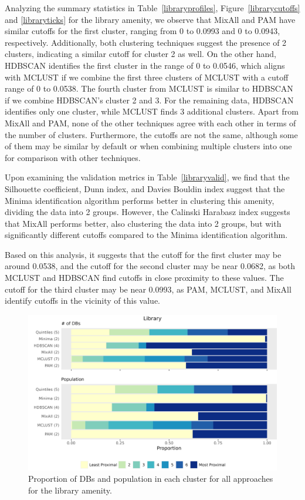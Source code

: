 \documentclass[11pt, a4paper]{article}
\begin{document}
Analyzing the summary statistics in Table~\ref{libraryprofiles}, Figure~\ref{librarycutoffs} and \ref{libraryticks} for the library amenity, we observe that MixAll and PAM have similar cutoffs for the first cluster, ranging from 0 to 0.0993 and 0 to 0.0943, respectively. Additionally, both clustering techniques suggest the presence of 2 clusters, indicating a similar cutoff for cluster 2 as well. On the other hand, HDBSCAN identifies the first cluster in the range of 0 to 0.0546, which aligns with MCLUST if we combine the first three clusters of MCLUST with a cutoff range of 0 to 0.0538. The fourth cluster from MCLUST is similar to HDBSCAN if we combine HDBSCAN's cluster 2 and 3. For the remaining data, HDBSCAN identifies only one cluster, while MCLUST finds 3 additional clusters. Apart from MixAll and PAM, none of the other techniques agree with each other in terms of the number of clusters. Furthermore, the cutoffs are not the same, although some of them may be similar by default or when combining multiple clusters into one for comparison with other techniques.
\par
Upon examining the validation metrics in Table~\ref{libraryvalid}, we find that the Silhouette coefficient, Dunn index, and Davies Bouldin index suggest that the Minima identification algorithm performs better in clustering this amenity, dividing the data into 2 groups. However, the Calinski Harabasz index suggests that MixAll performs better, also clustering the data into 2 groups, but with significantly different cutoffs compared to the Minima identification algorithm.
\par
Based on this analysis, it suggests that the cutoff for the first cluster may be around 0.0538, and the cutoff for the second cluster may be near 0.0682, as both MCLUST and HDBSCAN find cutoffs in close proximity to these values. The cutoff for the third cluster may be near 0.0993, as PAM, MCLUST, and MixAll identify cutoffs in the vicinity of this value.



\begin{figure}[H]
\centering
\includegraphics[width=\textwidth]{./barplot_comparison/Library_barplot.png}
\caption[Library profile barplot]{Proportion of DBs and population in each cluster for all approaches for the library amenity.}\label{librarybarplot}
\end{figure}
\end{document}
